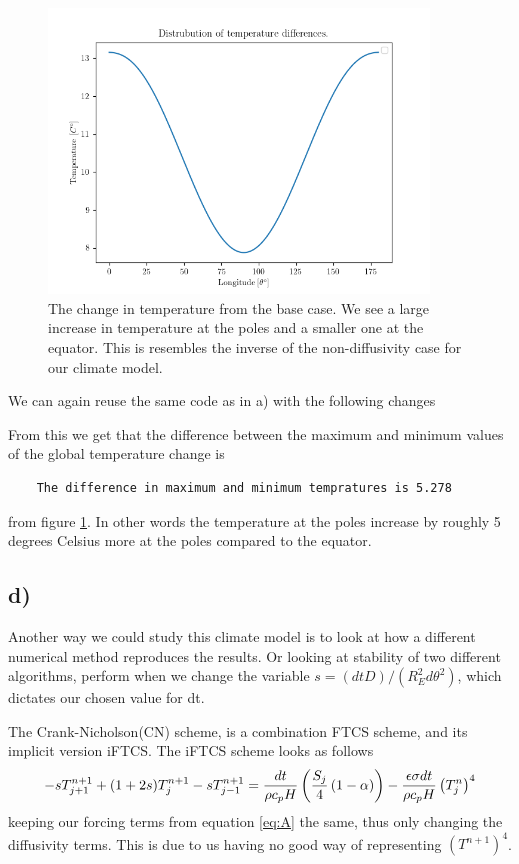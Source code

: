 \documentclass[10pt, a4paper]{amsart}
\begin{document}
\begin{figure}
	\centering\includegraphics[width=0.9\textwidth]{../code/c2.png}
	\caption{The change in temperature from the base case. We see a large increase in temperature at the poles and a smaller one at the equator. This is resembles the inverse of the non-diffusivity case for our climate model.}
	\label{fig:1c2}
\end{figure}

We can again reuse the same code as in a) with the following changes 


From this we get that the difference between the maximum and minimum values of the global temperature change is 
\begin{lstlisting}
	The difference in maximum and minimum tempratures is 5.278
\end{lstlisting}
from figure \ref{fig:1c2}. In other words the temperature at the poles increase by roughly 5 degrees Celsius more at the poles compared to the equator. 

\subsection{d)}
Another way we could study this climate model is to look at how a different numerical method reproduces the results. Or looking at stability of two different algorithms, perform when we change the variable $s = (dt D)/(R_E^2d\theta^2)$, which dictates our chosen value for dt. 

The Crank-Nicholson(CN) scheme, is a combination FTCS scheme, and its implicit version iFTCS. The iFTCS scheme looks as follows 
\begin{equation}
		- sT_{j+1}^{n+1} + (1 + 2s)T_j^{n+1} - sT_{j-1}^{n+1} = \\
		\\
		\frac{dt}{\rho c_pH}\left(\frac{S_j}{4}\left(1-\alpha\right)\right) - \frac{\epsilon\sigma dt}{\rho c_pH} \left(T_j^n\right)^4
\end{equation}
keeping our forcing terms from equation \ref{eq:A} the same, thus only changing the diffusivity terms. This is due to us having no good way of representing $(T^{n+1})^4$. 
\end{document}
